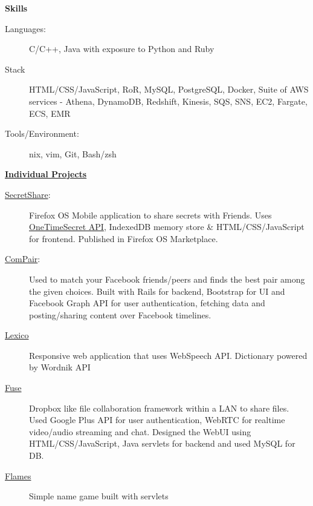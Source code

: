 \documentclass[letterpaper,11pt]{article}
\newcommand{\resheading}[1]{{\large \colorbox{mygrey}{\begin{minipage}{\textwidth}{\textbf{#1 \vphantom{p\^{E}}}}\end{minipage}}}}
\begin{document}
\resheading{{Skills}}
	\begin{description}
		\item[Languages:] { \footnotesize C/C++, Java with exposure to Python and Ruby
		}
		\item[Stack] { \footnotesize HTML/CSS/JavaScript, RoR, MySQL, PostgreSQL, Docker, Suite of AWS services - Athena, DynamoDB, Redshift, Kinesis, SQS, SNS, EC2, Fargate, ECS, EMR
		}
		\item[Tools/Environment:] {\footnotesize *nix, vim, Git, Bash/zsh
		}

	\end{description} %

\resheading{\href{https://github.com/dtsdwarak/}{Individual Projects}}

\begin{description}
\item[\href{https://github.com/dtsdwarak/secretshare}{SecretShare}:] { \footnotesize Firefox OS Mobile application to share secrets with Friends. Uses \href{https://onetimesecret.com/}{OneTimeSecret API}, IndexedDB memory store \& HTML/CSS/JavaScript for frontend. Published in Firefox OS Marketplace.}

\item[\href{https://github.com/dtsdwarak/compair}{ComPair}:] { \footnotesize Used to match your Facebook friends/peers and finds the best pair among the given choices. Built with Rails for backend, Bootstrap for UI and Facebook Graph API for user authentication, fetching data and posting/sharing content over Facebook timelines.\color{red}{\bf Won the best creative appliation award at RedHat's OpenShift DevConf 2014, Czech Republic}}

\item[\href{https://dtsdwarak.github.io/lexico/}{Lexico}] { \footnotesize Responsive web application that uses WebSpeech API. Dictionary powered by Wordnik API}

\item[\href{https://github.com/dtsdwarak/fuse}{Fuse}] { \footnotesize Dropbox like file collaboration framework within a LAN to share files. Used Google Plus API for user authentication, WebRTC for realtime video/audio streaming and chat. Designed the WebUI using HTML/CSS/JavaScript, Java servlets for backend and used MySQL for DB.}

\item[\href{https://github.com/dtsdwarak/flames/}{Flames}] { \footnotesize Simple name game built with servlets}

\end{description}
\end{document}
